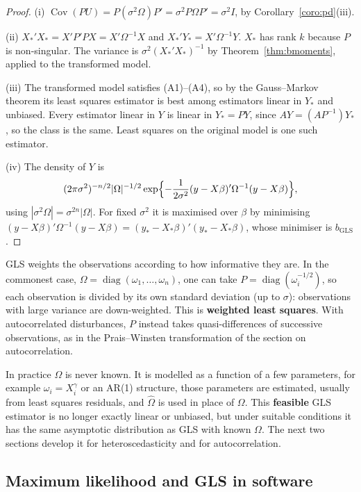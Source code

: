 \documentclass[11pt,a4paper]{article}
\numberwithin{equation}{section}
\DeclareMathOperator{\Cov}{Cov}
\theoremstyle{definition}
\begin{document}
\begin{proof}
(i) $\Cov(PU) = P(\sigma^2\Omega)P' = \sigma^2P\Omega P' = \sigma^2I$, by Corollary~\ref{coro:pd}(iii).

(ii) $X_*'X_* = X'P'PX = X'\Omega^{-1}X$ and $X_*'Y_* = X'\Omega^{-1}Y$. $X_*$ has rank $k$ because $P$ is non-singular. The variance is $\sigma^2(X_*'X_*)^{-1}$ by
Theorem~\ref{thm:bmoments}, applied to the transformed model.

(iii) The transformed model satisfies (A1)--(A4), so by the Gauss--Markov theorem its least squares estimator is best among estimators linear in $Y_*$
and unbiased. Every estimator linear in $Y$ is linear in $Y_* = PY$, since $AY = (AP^{-1})Y_*$, so the class is the same. Least squares on the original
model is one such estimator.

(iv) The density of $Y$ is
\[
(2\pi\sigma^2)^{-n/2}|\Omega|^{-1/2}\exp\Bigl\{-\frac{1}{2\sigma^2}(y - X\beta)'\Omega^{-1}(y - X\beta)\Bigr\} ,
\]
using $|\sigma^2\Omega| = \sigma^{2n}|\Omega|$. For fixed $\sigma^2$ it is maximised over $\beta$ by minimising $(y - X\beta)'\Omega^{-1}(y - X\beta) = (y_* - X_*\beta)'(y_* - X_*\beta)$,
whose minimiser is $b_{\text{GLS}}$.
\end{proof}

GLS weights the observations according to how informative they are. In the commonest case, $\Omega = \operatorname{diag}(\omega_1, \dots, \omega_n)$, one can take
$P = \operatorname{diag}(\omega_i^{-1/2})$, so each observation is divided by its own standard deviation (up to $\sigma$): observations with large variance
are down-weighted. This is \textbf{weighted least squares}. With autocorrelated disturbances, $P$ instead takes quasi-differences of successive
observations, as in the Prais--Winsten transformation of the section on autocorrelation.

In practice $\Omega$ is never known. It is modelled as a function of a few parameters, for example $\omega_i = X_i^\gamma$ or an AR(1) structure, those parameters are
estimated, usually from least squares residuals, and $\hat\Omega$ is used in place of $\Omega$. This \textbf{feasible} GLS estimator is no longer exactly linear or
unbiased, but under suitable conditions it has the same asymptotic distribution as GLS with known $\Omega$. The next two sections develop it for
heteroscedasticity and for autocorrelation.

\subsection{Maximum likelihood and GLS in software}
\label{ssec:software9}
\end{document}
